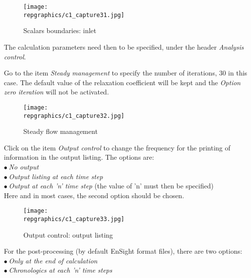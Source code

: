 \begin{figure}[ht]
\begin{center}
\texttt{[image: \\repgraphics/c1\_capture31.jpg]}
\caption{Scalars boundaries: inlet}
\label{fig31_e1}
\end{center}
\end{figure}


\clearpage
The calculation parameters need then to be specified, under the header {\itshape
Analysis control}.

Go to the item {\itshape Steady management} to specify the number of iterations,
30 in this case. The default value of the relaxation
coefficient will be kept and  the
{\itshape Option zero iteration} will not be activated.

\begin{figure}[ht]
\begin{center}
\texttt{[image: \\repgraphics/c1\_capture32.jpg]}
\caption{Steady flow management}
\label{fig32_e1}
\end{center}
\end{figure}


\clearpage
Click on the item {\itshape Output control} to change the frequency for the
printing of information in the output listing.
The options are:\\
\hspace*{1cm}$\bullet\ ${\itshape No output}\\
\hspace*{1cm}$\bullet\ ${\itshape Output listing at each time step}\\
\hspace*{1cm}$\bullet\ ${\itshape Output at each 'n' time step} (the value of
'n' must then be specified)\\
Here and in most cases, the second option should be chosen.

\begin{figure}[ht]
\begin{center}
\texttt{[image: \\repgraphics/c1\_capture33.jpg]}
\caption{Output control: output listing}
\label{fig33_e1}
\end{center}
\end{figure}


\clearpage
For the post-processing (by default EnSight format files), there are two options:\\
\hspace*{1cm}$\bullet\ ${\itshape Only at the end of calculation}\\
\hspace*{1cm}$\bullet\ ${\itshape Chronologics at each 'n' time steps}

